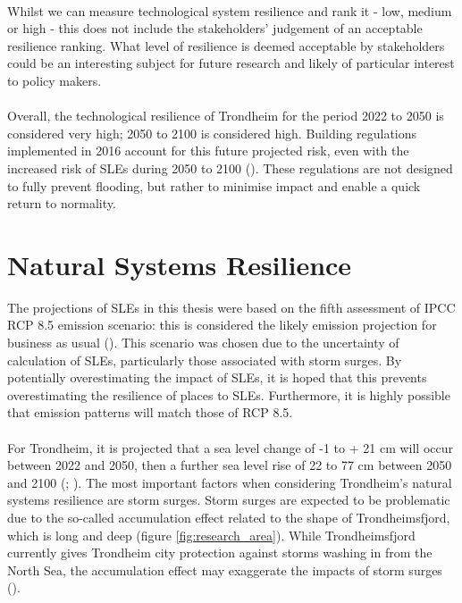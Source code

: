 \paragraph{}
Whilst we can measure technological system resilience and rank it - low, medium or high - this does not include the stakeholders' judgement of an acceptable resilience ranking. What level of resilience is deemed acceptable by stakeholders could be an interesting subject for future research and likely of particular interest to policy makers.
\paragraph{}
Overall, the technological resilience of Trondheim for the period 2022 to 2050 is considered very high; 2050 to 2100 is considered high. Building regulations implemented in 2016 account for this future projected risk, even with the increased risk of SLEs during 2050 to 2100 (\cite{direktoratet_for_byggkvalitet_direktoratet_2016}). These regulations are not designed to fully prevent flooding, but rather to minimise impact and enable a quick return to normality. 


\section{Natural Systems Resilience}
The projections of SLEs in this thesis were based on the fifth assessment of IPCC RCP 8.5 emission scenario: this is considered the likely emission projection for business as usual (\cite{hanssen-bauer_climate_2017}). This scenario was chosen due to the uncertainty of calculation of SLEs, particularly those associated with storm surges. By potentially overestimating the impact of SLEs, it is hoped that this prevents overestimating the resilience of places to SLEs. Furthermore, it is highly possible that emission patterns will match those of RCP 8.5. 
\paragraph{}

For Trondheim, it is projected that a sea level change of -1 to + 21 cm will occur between 2022 and 2050, then a further sea level rise of 22 to 77 cm between 2050 and 2100 (\cite{hanssen_saksframlegg_2013}; \cite{kartverket_se_2021}). The most important factors when considering Trondheim's natural systems resilience are storm surges. Storm surges are expected to be problematic due to the so-called accumulation effect related to the shape of Trondheimsfjord, which is long and deep  (figure \ref{fig:research_area}). While Trondheimsfjord currently gives Trondheim city protection against storms washing in from the North Sea, the accumulation effect may exaggerate the impacts of storm surges (\cite{hanssen_saksframlegg_2013}). 
